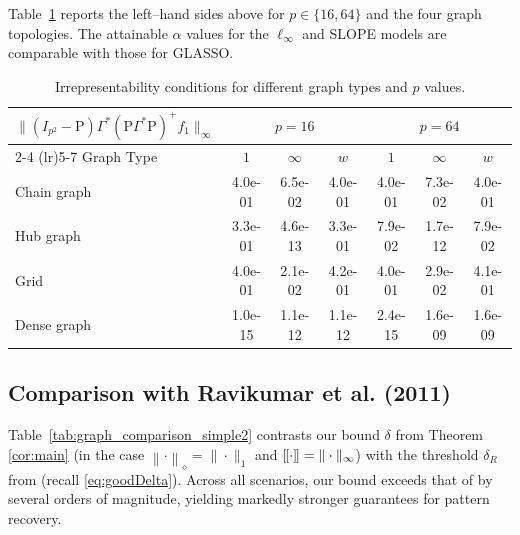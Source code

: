 \documentclass[12pt]{amsart}
\numberwithin{equation}{section}
\numberwithin{equation}{section}
\theoremstyle{definition}
\newcommand{\poly}[1]{\left\|#1\right\|_\diamond}
\newcommand{\PP}{\mathrm{P}}
\newcommand{\cnorm}[1]{[\mkern-1.5mu[#1]\mkern-1.5mu]}
\begin{document}
Table~\ref{tab:graph_comparison_simple} reports the left--hand sides above for $p\in\{16,64\}$ and the four graph topologies.  The attainable $\alpha$ values for the $\ell_{\infty}$ and SLOPE models are comparable with those for GLASSO.

\begin{table}[htbp]
	\centering
	\begin{tabular}{l cccccc} 
		\toprule
$\| (I_{p^2}-\PP) \Gamma^\ast  (\PP \Gamma^\ast \PP)^+  f_1 \|_\infty$		& \multicolumn{3}{c}{$p = 16$} & \multicolumn{3}{c}{$p = 64$} \\
		\cmidrule(lr){2-4} \cmidrule(lr){5-7} %
		Graph Type       & $1$ & $\infty$ & $w$ & $1$ & $\infty$ & $w$ \\
		\midrule
		Chain graph      & 4.0e-01 & 6.5e-02 & 4.0e-01 & 4.0e-01 & 7.3e-02 & 4.0e-01 \\
		Hub graph        & 3.3e-01 & 4.6e-13 & 3.3e-01 & 7.9e-02 & 1.7e-12 & 7.9e-02 \\
		Grid             & 4.0e-01 & 2.1e-02 & 4.2e-01 &  4.0e-01 & 2.9e-02 & 4.1e-01 \\
		Dense graph & 1.0e-15 & 1.1e-12 & 1.1e-12 & 2.4e-15 & 1.6e-09  &  1.6e-09  \\
		\bottomrule
	\end{tabular}
	\caption{Irrepresentability conditions for different graph types and $p$ values.}
	\label{tab:graph_comparison_simple}
\end{table}



\subsection{Comparison with Ravikumar et al. (2011)}

Table~\ref{tab:graph_comparison_simple2} contrasts  our bound $\delta$ from Theorem \ref{cor:main} (in the case $\poly{\cdot}=\|\cdot\|_1$ and $\cnorm{\cdot}=\|\cdot\|_{\infty}$) with the threshold $\delta_R$ from \citet{ravikumar2011graphical} (recall \eqref{eq:goodDelta}). Across all scenarios, our bound exceeds that of \citet{ravikumar2011graphical} by several orders of magnitude, yielding markedly stronger guarantees for pattern recovery.
\end{document}
